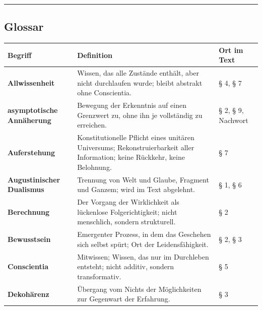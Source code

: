 \documentclass[
  ngerman,
]{article}
\begin{document}
\begin{center}\rule{0.5\linewidth}{0.5pt}\end{center}

\subsection{Glossar}\label{glossar}

\begin{longtable}[]{@{}
  >{\raggedright\arraybackslash}p{}
  >{\raggedright\arraybackslash}p{}
  >{\raggedright\arraybackslash}p{}@{}}
\toprule\noalign{}
\begin{minipage}[b]{\linewidth}\raggedright
Begriff
\end{minipage} & \begin{minipage}[b]{\linewidth}\raggedright
Definition
\end{minipage} & \begin{minipage}[b]{\linewidth}\raggedright
Ort im Text
\end{minipage} \\
\midrule\noalign{}
\endhead
\bottomrule\noalign{}
\endlastfoot
\textbf{Allwissenheit} & Wissen, das alle Zustände enthält, aber nicht
durchlaufen wurde; bleibt abstrakt ohne Conscientia. & § 4, § 7 \\
\textbf{asymptotische Annäherung} & Bewegung der Erkenntnis auf einen
Grenzwert zu, ohne ihn je vollständig zu erreichen. & § 2, § 9,
Nachwort \\
\textbf{Auferstehung} & Konstitutionelle Pflicht eines unitären
Universums; Rekonstruierbarkeit aller Information; keine Rückkehr, keine
Belohnung. & § 7 \\
\textbf{Augustinischer Dualismus} & Trennung von Welt und Glaube,
Fragment und Ganzem; wird im Text abgelehnt. & § 1, § 6 \\
\textbf{Berechnung} & Der Vorgang der Wirklichkeit als lückenlose
Folgerichtigkeit; nicht menschlich, sondern strukturell. & § 2 \\
\textbf{Bewusstsein} & Emergenter Prozess, in dem das Geschehen sich
selbst spürt; Ort der Leidensfähigkeit. & § 2, § 3 \\
\textbf{Conscientia} & Mitwissen; Wissen, das nur im Durchleben
entsteht; nicht additiv, sondern transformativ. & § 5 \\
\textbf{Dekohärenz} & Übergang vom Nichts der Möglichkeiten zur
Gegenwart der Erfahrung. & § 3 \\

\end{longtable}
\end{document}
